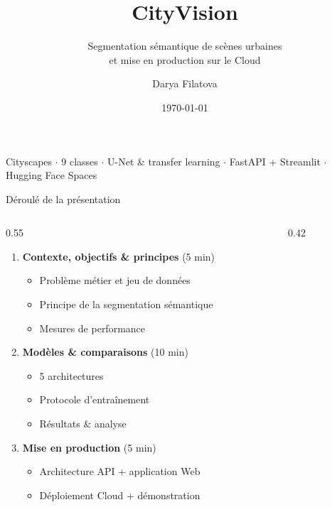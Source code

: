 \documentclass[aspectratio=169,11pt]{beamer}
\title[CityVision]{CityVision}
\subtitle{Segmentation sémantique de scènes urbaines\\ et mise en production sur le Cloud}
\author{Darya Filatova}
\institute{Projet 8 --- Ingénieur IA}
\date{\today}
\newcommand{\emphc}[1]{\textbf{\color{cvblue}#1}}
\begin{document}
\begin{frame}[plain]
  \titlepage
  \begin{center}
    \footnotesize\color{gray}
    Cityscapes $\cdot$ 9 classes $\cdot$ U-Net \& transfer learning $\cdot$ FastAPI + Streamlit $\cdot$ Hugging Face Spaces
  \end{center}
\end{frame}

\begin{frame}{Déroulé de la présentation}
  \begin{columns}[T]
    \begin{column}{0.55\textwidth}
      \begin{enumerate}
        \item \emphc{Contexte, objectifs \& principes} \hfill{\small(5 min)}
          \begin{itemize}\footnotesize
            \item Problème métier et jeu de données
            \item Principe de la segmentation sémantique
            \item Mesures de performance
          \end{itemize}
        \item \emphc{Modèles \& comparaisons} \hfill{\small(10 min)}
          \begin{itemize}\footnotesize
            \item 5 architectures
            \item Protocole d'entraînement
            \item Résultats \& analyse
          \end{itemize}
        \item \emphc{Mise en production} \hfill{\small(5 min)}
          \begin{itemize}\footnotesize
            \item Architecture API + application Web
            \item Déploiement Cloud + démonstration
          \end{itemize}
      \end{enumerate}
    \end{column}
    \begin{column}{0.42\textwidth}
      \centering
    \end{column}
  \end{columns}
\end{frame}
\end{document}
